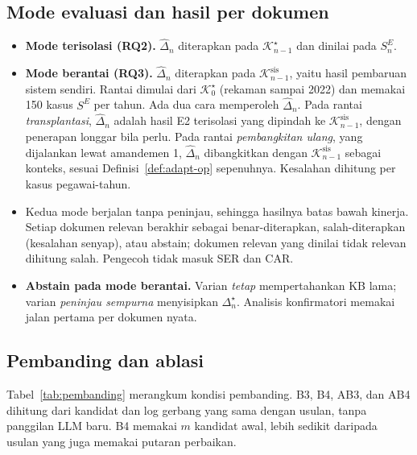 \documentclass[conference]{IEEEtran}
\makeatletter
\DeclareRobustCommand{\en}[1]{{\usefont{\f@encoding}{\f@family}{\f@series}{it}#1\/}}
\newcommand{\K}{\mathcal{K}}
\newcommand{\emas}{\star}
\newcommand{\SE}{S^{E}}
\makeatother
\begin{document}
\subsection{Mode evaluasi dan hasil per dokumen}
\begin{itemize}[leftmargin=*,nosep]
  \item \textbf{Mode terisolasi (RQ2).} $\hat{\Delta}_n$ diterapkan pada $\K^{\emas}_{n-1}$ dan dinilai pada $\SE_n$.
  \item \textbf{Mode berantai (RQ3).} $\hat{\Delta}_n$ diterapkan pada $\K^{\mathrm{sis}}_{n-1}$, yaitu hasil pembaruan sistem sendiri. Rantai dimulai dari $\K^{\emas}_0$ (rekaman sampai 2022) dan memakai 150 kasus $\SE$ per tahun. Ada dua cara memperoleh $\hat{\Delta}_n$. Pada rantai \emph{transplantasi}, $\hat{\Delta}_n$ adalah hasil E2 terisolasi yang dipindah ke $\K^{\mathrm{sis}}_{n-1}$, dengan penerapan longgar bila perlu. Pada rantai \emph{pembangkitan ulang}, yang dijalankan lewat amandemen 1, $\hat{\Delta}_n$ dibangkitkan dengan $\K^{\mathrm{sis}}_{n-1}$ sebagai konteks, sesuai Definisi~\ref{def:adapt-op} sepenuhnya. Kesalahan dihitung per kasus pegawai-tahun.
  \item Kedua mode berjalan tanpa peninjau, sehingga hasilnya batas bawah kinerja. Setiap dokumen relevan berakhir sebagai benar-diterapkan, salah-diterapkan (kesalahan senyap), atau \en{abstain}; dokumen relevan yang dinilai tidak relevan dihitung salah. Pengecoh tidak masuk SER dan CAR.
  \item \textbf{\en{Abstain} pada mode berantai.} Varian \emph{tetap} mempertahankan KB lama; varian \emph{peninjau sempurna} menyisipkan $\Delta^{\emas}_n$. Analisis konfirmatori memakai jalan pertama per dokumen nyata.
\end{itemize}

\subsection{Pembanding dan ablasi}
Tabel~\ref{tab:pembanding} merangkum kondisi pembanding. B3, B4, AB3, dan AB4 dihitung dari kandidat dan log gerbang yang sama dengan usulan, tanpa panggilan LLM baru. B4 memakai $m$ kandidat awal, lebih sedikit daripada usulan yang juga memakai putaran perbaikan.
\end{document}

